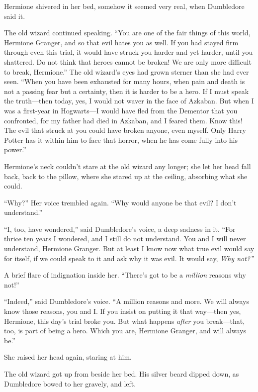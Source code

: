 Hermione shivered in her bed, somehow it seemed very real, when
Dumbledore said it.

The old wizard continued speaking. ``You are one of the fair things of
this world, Hermione Granger, and so that evil hates you as well. If you
had stayed firm through even this trial, it would have struck you harder
and yet harder, until you shattered. Do not think that heroes cannot be
broken! We are only more difficult to break, Hermione.'' The old
wizard's eyes had grown sterner than she had ever seen. ``When you have
been exhausted for many hours, when pain and death is not a passing fear
but a certainty, then it is harder to be a hero. If I must speak the
truth---then today, yes, I would not waver in the face of Azkaban. But
when I was a first-year in Hogwarts---I would have fled from the
Dementor that you confronted, for my father had died in Azkaban, and I
feared them. Know this! The evil that struck at you could have broken
anyone, even myself. Only Harry Potter has it within him to face that
horror, when he has come fully into his power.''

Hermione's neck couldn't stare at the old wizard any longer; she let her
head fall back, back to the pillow, where she stared up at the ceiling,
absorbing what she could.

``Why?'' Her voice trembled again. ``Why would anyone be that evil? I
don't understand.''

``I, too, have wondered,'' said Dumbledore's voice, a deep sadness in
it. ``For thrice ten years I wondered, and I still do not understand.
You and I will never understand, Hermione Granger. But at least I know
now what true evil would say for itself, if we could speak to it and ask
why it was evil. It would say, \emph{Why not?''}

A brief flare of indignation inside her. ``There's got to be a
\emph{million} reasons why not!''

``Indeed,'' said Dumbledore's voice. ``A million reasons and more. We
will always know those reasons, you and I. If you insist on putting it
that way---then yes, Hermione, this day's trial broke you. But what
happens \emph{after} you break---that, too, is part of being a hero.
Which you are, Hermione Granger, and will always be.''

She raised her head again, staring at him.

The old wizard got up from beside her bed. His silver beard dipped down,
as Dumbledore bowed to her gravely, and left.

